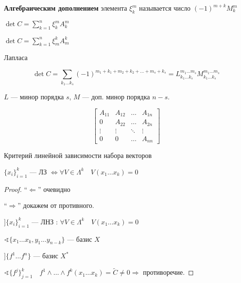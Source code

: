 \begin{definition}
    \textbf{Алгебраическим дополнением} элемента \(\xi_k^m\) называется число \((-1)^{m+k} M_k^m\)

    \(\det C = \sum\limits_{k=1}^n \xi_k^m A_k^m\)

    \(\det C = \sum\limits_{k=1}^n \xi_m^k A_m^k\)
\end{definition}

\begin{theorem}
    Лапласа

    \[\det C = \sum\limits_{k_1\ldots k_s} (-1)^{m_1+k_1+m_2+k_2+\ldots+m_s+k_s}=L^{m_1\ldots m_s}_{k_1\ldots k_s} M^{m_1\ldots m_s}_{k_1\ldots k_s}\]

    \(L\) --- минор порядка \(s\), \(M\) --- доп. минор порядка \(n-s\).
\end{theorem}

\begin{corollary}
    \[\begin{bmatrix}
            A_{11} & A_{12} & \ldots & A_{1n} \\
            0      & A_{22} & \ldots & A_{2n} \\
            \vdots & \vdots & \ddots & \vdots \\
            0      & 0      & \ldots & A_{nn}
        \end{bmatrix}\]
\end{corollary}

\begin{theorem}
    Критерий линейной зависимости набора векторов

    \(\{x_i\}_{i=1}^k\) --- ЛЗ \(\Leftrightarrow \forall V\in \Lambda^k \quad V(x_1\ldots x_k)=0\)
\end{theorem}
\begin{proof}
    ``\(\Leftarrow\)'' очевидно

    ``\(\Rightarrow\)'' докажем от противного.

    \(] \{x_i\}_{i=1}^k\) --- ЛНЗ : \(\forall V\in \Lambda^k \quad V(x_1\ldots x_k)=0\)

    \(\sphericalangle \{x_1\ldots x_k, y_1\ldots y_{n-k}\}\) --- базис \(X\)

    \(] \{f^1\ldots f^n\}\) --- базис \(X^*\)

    \(\sphericalangle \{f^j\}_{j=1}^k\quad f^1\wedge\ldots\wedge f^k(x_1\ldots x_k)=\tilde C\not=0\Rightarrow \) противоречие.
\end{proof}



